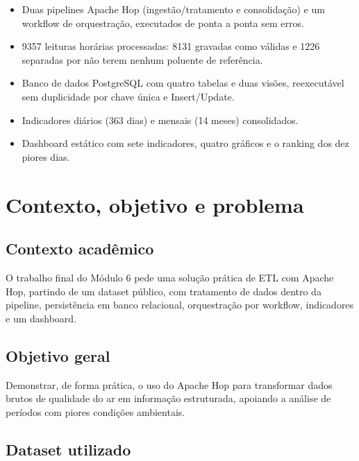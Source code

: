 \documentclass[12pt,a4paper,openany]{report}
\begin{document}
\begin{resumobox}
  \begin{itemize}
    \item Duas pipelines Apache Hop (ingestão/tratamento e consolidação) e um
      workflow de orquestração, executados de ponta a ponta sem erros.
    \item 9357 leituras horárias processadas: 8131 gravadas como válidas e
      1226 separadas por não terem nenhum poluente de referência.
    \item Banco de dados PostgreSQL com quatro tabelas e duas visões,
      reexecutável sem duplicidade por chave única e Insert/Update.
    \item Indicadores diários (363 dias) e mensais (14 meses) consolidados.
    \item Dashboard estático com sete indicadores, quatro gráficos e o ranking
      dos dez piores dias.
  \end{itemize}
\end{resumobox}

\tableofcontents
\clearpage


\chapter{Contexto, objetivo e problema}

\section{Contexto acadêmico}

O trabalho final do Módulo 6 pede uma solução prática de ETL com Apache Hop,
partindo de um dataset público, com tratamento de dados dentro da pipeline,
persistência em banco relacional, orquestração por workflow, indicadores e um
dashboard.

\section{Objetivo geral}

Demonstrar, de forma prática, o uso do Apache Hop para transformar dados
brutos de qualidade do ar em informação estruturada, apoiando a análise de
períodos com piores condições ambientais.

\section{Dataset utilizado}
\end{document}
